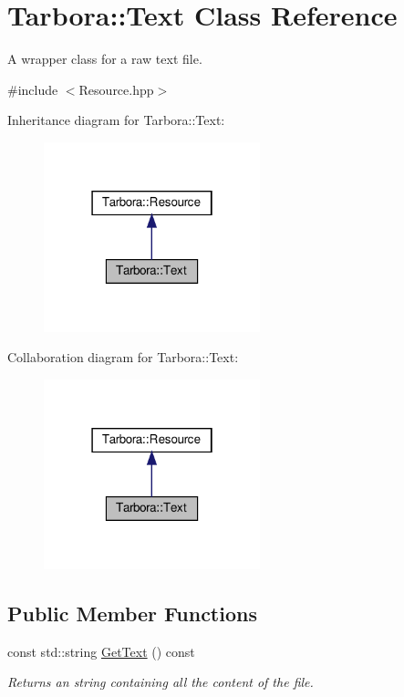 \hypertarget{classTarbora_1_1Text}{}\section{Tarbora\+:\+:Text Class Reference}
\label{classTarbora_1_1Text}


A wrapper class for a raw text file.  




{\ttfamily \#include $<$Resource.\+hpp$>$}



Inheritance diagram for Tarbora\+:\+:Text\+:\nopagebreak
\begin{figure}[H]
\begin{center}
\leavevmode
\includegraphics[width=178pt]{classTarbora_1_1Text__inherit__graph}
\end{center}
\end{figure}


Collaboration diagram for Tarbora\+:\+:Text\+:\nopagebreak
\begin{figure}[H]
\begin{center}
\leavevmode
\includegraphics[width=178pt]{classTarbora_1_1Text__coll__graph}
\end{center}
\end{figure}
\subsection*{Public Member Functions}
\begin{DoxyCompactItemize}
\item 
\mbox{\label{classTarbora_1_1Text_a196ccb63a134aabf6336c1ae17c3108e}} 
const std\+::string \hyperlink{classTarbora_1_1Text_a196ccb63a134aabf6336c1ae17c3108e}{Get\+Text} () const
\begin{DoxyCompactList}\small\item\em Returns an string containing all the content of the file. \end{DoxyCompactList}\end{DoxyCompactItemize}
